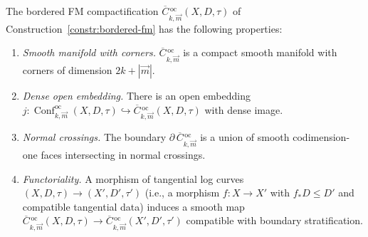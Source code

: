 \begin{theorem}
\label{thm:bordered-fm-properties}
The bordered FM compactification
$\overline{C}{}^{\,\mathrm{oc}}_{k,\vec{m}}(X, D, \tau)$ of
Construction~\textup{\ref{constr:bordered-fm}} has the following
properties:
\begin{enumerate}[label=\textup{(\roman*)}]
\item \emph{Smooth manifold with corners.}
  $\overline{C}{}^{\,\mathrm{oc}}_{k,\vec{m}}$ is a compact smooth
  manifold with corners of dimension $2k + |\vec{m}|$.
\item \emph{Dense open embedding.}
  There is an open embedding
  $j \colon \operatorname{Conf}^{\mathrm{oc}}_{k,\vec{m}}(X, D, \tau)
  \hookrightarrow
  \overline{C}{}^{\,\mathrm{oc}}_{k,\vec{m}}(X, D, \tau)$
  with dense image.
\item \emph{Normal crossings.}
  The boundary $\partial\,\overline{C}{}^{\,\mathrm{oc}}_{k,\vec{m}}$
  is a union of smooth codimension-one faces intersecting in
  normal crossings.
\item \emph{Functoriality.}
  A morphism of tangential log curves $(X, D, \tau) \to
  (X', D', \tau')$ (i.e., a morphism $f \colon X \to X'$ with
  $f_* D \leq D'$ and compatible tangential data) induces a
  smooth map
  $\overline{C}{}^{\,\mathrm{oc}}_{k,\vec{m}}(X, D, \tau) \to
  \overline{C}{}^{\,\mathrm{oc}}_{k,\vec{m}}(X', D', \tau')$
  compatible with boundary stratification.
\end{enumerate}
\end{theorem}

